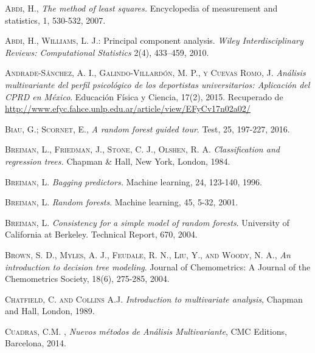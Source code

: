 
\begin{thebibliography}{99}
	

 \textsc{Abdi, H.,} \emph{The method of least squares.} Encyclopedia of measurement and statistics, 1, 530-532, 2007.


 \textsc{Abdi, H., Williams, L. J.: } Principal component analysis. \emph{Wiley Interdisciplinary Reviews: Computational Statistics}  2(4), 433–459, 2010.


\textsc{Andrade-Sánchez, A. I., Galindo-Villardón, M. P., y Cuevas Romo, J. } \emph{Análisis multivariante del perfil psicológico de los deportistas universitarios: Aplicación del CPRD en México}. Educación Física y Ciencia, 17(2), 2015.  Recuperado de \url{http://www.efyc.fahce.unlp.edu.ar/article/view/EFyCv17n02a02/}


\textsc{Biau, G.; Scornet, E}., \textit{A random forest guided tour}. Test, 25, 197-227, 2016.

\textsc{Breiman, L., Friedman, J., Stone, C. J., Olshen, R. A.} \emph{Classification and regression trees. }Chapman \& Hall, New York, London, 1984.

\textsc{Breiman, L. } \emph{Bagging predictors.} Machine learning, 24, 123-140, 1996.

\textsc{Breiman, L. } \emph{Random forests}. Machine learning, 45, 5-32, 2001.

\textsc{Breiman, L. } \emph{Consistency for a simple model of random forests}. University of California at Berkeley. Technical Report, 670, 2004.

 \textsc{Brown, S. D.,  Myles, A. J., Feudale, R. N., Liu, Y., and Woody, N. A.,} \emph{An introduction to decision tree modeling}. Journal of Chemometrics: A Journal of the Chemometrics Society, 18(6), 275-285, 2004.

 \textsc{Chatfield, C. and Collins A.J}. {\em Introduction to multivariate analysis}, Chapman and Hall, London, 1989.

 \textsc{Cuadras, C.M. }, \textit{Nuevos métodos de Análisis Multivariante}, CMC Editions, Barcelona, 
2014.


\end{thebibliography}
